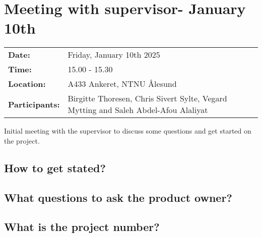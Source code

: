 \section{Meeting with supervisor- January 10th}
\begin{tabular}{ll}
    \textbf{Date:} & Friday, January 10th 2025 \\
    \textbf{Time:} & 15.00 - 15.30\\
    \textbf{Location:} & A433 Ankeret, NTNU Ålesund \\
    \textbf{Participants:} & Birgitte Thoresen, Chris Sivert Sylte, Vegard Mytting and Saleh Abdel-Afou Alaliyat\\
\end{tabular}

\vspace{0.5cm}

Initial meeting with the supervisor to discuss some questions and get started on the project.

\subsection*{How to get stated?}

\subsection*{What questions to ask the product owner?}

\subsection*{What is the project number?}
